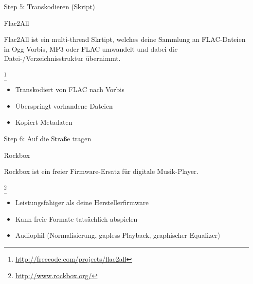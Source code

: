 \documentclass[aspectratio=1610]{beamer}
\newcommand{\src}[1]{
  \raggedright{
    \footnote{
      \small{\url{#1}}
    }
  }
}
\newcommand{\concept}[2]{
  \footnotesize{
    \begin{block}{#1}
      \pause
      #2
    \end{block}
  }
}
\begin{document}
  \begin{frame}{Step 5: Transkodieren (Skript)}
    \concept{Flac2All}{
      Flac2All ist ein multi-thread Skrtipt, welches deine Sammlung an
      FLAC-Dateien in Ogg Vorbis, MP3 oder FLAC umwandelt und dabei die
      Datei-/Verzeichnisstruktur übernimmt.
      \src{http://freecode.com/projects/flac2all}
    }
    \begin{itemize}
      \pause
      \item Transkodiert von FLAC nach Vorbis
      \pause
      \item Überspringt vorhandene Dateien
      \pause
      \item Kopiert Metadaten
    \end{itemize}
  \end{frame}

  \begin{frame}{Step 6: Auf die Straße tragen}
    \concept{Rockbox}{
      Rockbox ist ein freier Firmware-Ersatz für digitale Musik-Player.
      \src{http://www.rockbox.org/}
    }
    \begin{itemize}
      \pause
      \item Leistungsfähiger als deine Herstellerfirmware
      \pause
      \item Kann freie Formate tatsächlich abspielen
      \pause
      \item Audiophil (Normalisierung, gapless Playback, graphischer Equalizer)
    \end{itemize}
  \end{frame}
\end{document}
